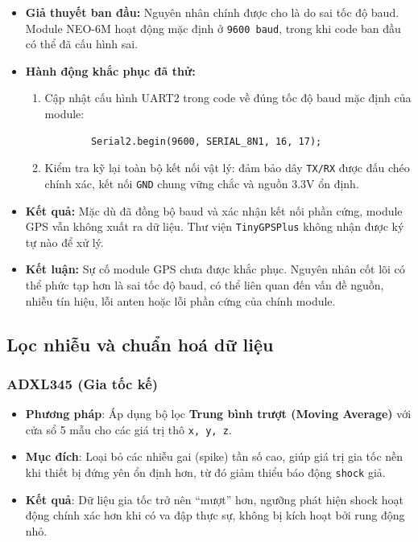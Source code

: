\begin{itemize}
    \item \textbf{Giả thuyết ban đầu:} 
    Nguyên nhân chính được cho là do sai tốc độ baud. 
    Module NEO-6M hoạt động mặc định ở \texttt{9600 baud}, 
    trong khi code ban đầu có thể đã cấu hình sai.

    \item \textbf{Hành động khắc phục đã thử:}
    \begin{enumerate}
        \item Cập nhật cấu hình UART2 trong code về đúng tốc độ baud mặc định của module:
        \begin{verbatim}
        Serial2.begin(9600, SERIAL_8N1, 16, 17);
        \end{verbatim}
    \item Kiểm tra kỹ lại toàn bộ kết nối vật lý: đảm bảo dây \texttt{TX/RX} được đấu chéo chính xác, kết nối \texttt{GND} chung vững chắc và nguồn 3.3V ổn định.
    \end{enumerate}

    \item \textbf{Kết quả:} 
    Mặc dù đã đồng bộ baud và xác nhận kết nối phần cứng, 
    module GPS vẫn không xuất ra dữ liệu. 
    Thư viện \texttt{TinyGPSPlus} không nhận được ký tự nào để xử lý.

    \item \textbf{Kết luận:} 
    Sự cố module GPS chưa được khắc phục. 
    Nguyên nhân cốt lõi có thể phức tạp hơn là sai tốc độ baud, 
    có thể liên quan đến vấn đề nguồn, nhiễu tín hiệu, lỗi anten hoặc lỗi phần cứng của chính module.
\end{itemize}

\subsection{Lọc nhiễu và chuẩn hoá dữ liệu}

\subsubsection{ADXL345 (Gia tốc kế)}
\begin{itemize}
    \item \textbf{Phương pháp}: 
    Áp dụng bộ lọc \textbf{Trung bình trượt (Moving Average)} với cửa sổ 5 mẫu cho các giá trị thô \texttt{x, y, z}.

    \item \textbf{Mục đích}: 
    Loại bỏ các nhiễu gai (spike) tần số cao, giúp giá trị gia tốc nền khi thiết bị đứng yên ổn định hơn, 
    từ đó giảm thiểu báo động \texttt{shock} giả.

    \item \textbf{Kết quả}: 
    Dữ liệu gia tốc trở nên “mượt” hơn, ngưỡng phát hiện shock hoạt động chính xác hơn khi có va đập thực sự, 
    không bị kích hoạt bởi rung động nhỏ.
\end{itemize}

